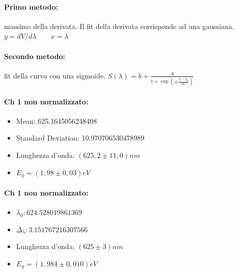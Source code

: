 \documentclass{article}
\begin{document}
\begin{center}
    \begin{minipage}{0.4\textwidth}
        \paragraph{Primo metodo:} massimo della derivata. Il fit della derivata corrisponde ad una gaussiana.
        $y= dV/d\lambda \quad \quad x=\lambda$
    \end{minipage}
    \hfill
    \begin{minipage}{0.4\textwidth}
        \paragraph{Secondo metodo:} fit della curva con una sigmoide.
        \newline
        $S(\lambda) = b + \frac{A}{1+\exp(\pm\frac{\lambda- \lambda_0}{\Delta\lambda})}$
    \end{minipage}
\end{center}
\begin{center}
    \begin{minipage}{0.4\textwidth}
        \paragraph{Ch 1 non normalizzato:}
        \begin{itemize}
            \item Mean: 625.1645056248408 
            \item Standard Deviation: 10.970706530478989
            \item Lunghezza d'onda:  $(625,2 \pm11,0)nm$ 
            \item $E_g=(  1,98\pm0,03  )eV$
        \end{itemize}
    \end{minipage}
    \hfill
    \begin{minipage}{0.4\textwidth}
        \paragraph{Ch 1 non normalizzato:}
        \begin{itemize}
            \item $\lambda_0: 624.528019861369$
            \item $\Delta_\lambda: 3.151767216307566$
            \item Lunghezza d'onda:  $(625 \pm3)nm$
            \item $E_g=(  1,984\pm0,010  )eV$
        \end{itemize}
    \end{minipage}
\end{center}
\end{document}
